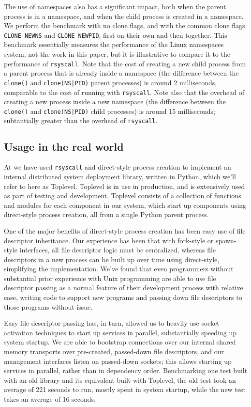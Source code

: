 \documentclass[letterpaper,twocolumn,10pt]{article}
\begin{document}
The use of namespaces also has a significant impact,
both when the parent process is in a namespace, and when the child process is created in a namespace.
We perform the benchmark with no clone flags, and with the common clone flags
\verb|CLONE_NEWNS| and \verb|CLONE_NEWPID|, first on their own and then together.
This benchmark essentially measures the performance of the Linux namespaces system, not the work in this paper,
but it is illustrative to compare it to the performance of \texttt{rsyscall}.
Note that the cost of creating a new child process from a parent process that is already inside a namespace
(the difference between the \texttt{clone()} and \texttt{clone(NS|PID)} parent processes)
is around 2 milliseconds, comparable to the cost of running with \texttt{rsyscall}.
Note also that the overhead of creating a new process inside a new namespace
(the difference between the \texttt{clone()} and \texttt{clone(NS|PID)} child processes)
is around 15 milliseconds; subtantially greater than the overhead of \texttt{rsyscall}.
\subsection{Usage in the real world}\label{realworld}
At \twosigma we have used \texttt{rsyscall} and direct-style process creation
to implement an internal distributed system deployment library, written in Python,
which we'll refer to here as Toplevel.
Toplevel is in use in production,
and is extensively used as part of testing and development.
Toplevel consists of a collection of functions and modules
for each component in our system,
which start up components using direct-style process creation,
all from a single Python parent process.

One of the major benefits of direct-style process creation has been easy use of file descriptor inheritance.
Our experience has been that with fork-style or spawn-style interfaces,
all file descriptor logic must be centralized,
whereas file descriptors in a new process can be built up over time using direct-style,
simplifying the implementation.
We've found that even programmers without substantial prior experience with Unix programming
are able to use file descriptor passing as a normal feature of their development process with relative ease,
writing code to support new programs and passing down file descriptors to those programs without issue.

Easy file descriptor passing has, in turn, allowed us to heavily use socket activation techniques
to start up services in parallel,
substantially speeding up system startup.\cite{socketactivation}
We are able to bootstrap connections over our internal shared memory transports
over pre-created, passed-down file descriptors,
and our management interfaces listen on passed-down sockets;
this allows starting up services in parallel, rather than in dependency order.
Benchmarking one test built with an old library and its equivalent built with Toplevel,
the old test took an average of 221 seconds to run,
mostly spent in system startup,
while the new test takes an average of 16 seconds.
\end{document}
